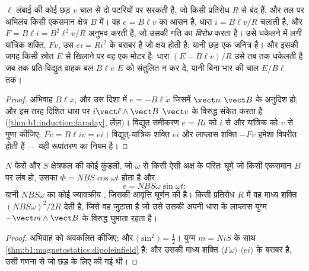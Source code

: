 \begin{proposition}[सरकती छड़]\label{prop:b1:induction:rails}
$\ell$ लंबाई की कोई छड़ $v$ चाल से दो पटरियों पर सरकती है, जो किसी
प्रतिरोध $R$ से बंद हैं, और तल पर अभिलंब किसी एकसमान क्षेत्र $B$ में। वह
 $e = B\ell v$ का आसन है, धारा $i = B\ell v/R$ चलाती है, और
 $F = B\ell i = B^2\ell^2v/R$ अनुभव करती है, जो उसकी गति का
\emph{विरोध} करता है। उसे धकेलने में लगी यांत्रिक शक्ति, $Fv$, उस  $ei = Ri^2$ के बराबर है जो क्षय होती है: यानी छड़ एक जनित्र है। और
इसकी जगह किसी स्रोत $E$ से खिलाने पर वह एक मोटर है: धारा $(E - B\ell v)/R$
उसे तब तक धकेलती है जब तक प्रति-विद्युत वाहक बल $B\ell v$ $E$ को संतुलित न
कर दे, यानी बिना भार की चाल $E/B\ell$ तक।
\end{proposition}

\begin{proof}
अभिवाह $B\ell x$, और उस दिशा में $e = -B\ell\dot x$ जिसमें $\vect n$
$\vect B$ के अनुदिश हो; और इस तरह दिशित धारा पर  $i\vect\ell\wedge\vect B$
$\vect v$ के विरुद्ध संकेत करता है (\cref{thm:b1:induction:faraday},
लेंज़)। विद्युत समीकरण $e = Ri$ को $i$ से और यांत्रिक को $v$ से गुणा
कीजिए: $Fv = B\ell iv = ei$। विद्युत्-यांत्रिक शक्ति
$ei$ और लाप्लास शक्ति $-Fv$ हमेशा विपरीत होती हैं --- यही रूपांतरण का
नियम है।
\end{proof}

\begin{proposition}[घूमता पाश: प्रत्यावर्तित्र]\label{prop:b1:induction:alternator}
$N$ फेरों और $S$ क्षेत्रफल की कोई कुंडली, जो $\omega$ से किसी ऐसी अक्ष के
परितः घूमे जो किसी एकसमान $B$ पर लंब हो, उसका $\Phi = NBS\cos\omega t$ होता है और
\[
e = NBS\omega\sin\omega t :
\]
यानी $NBS\omega$  का कोई ज्यावक्रीय , जिसकी आवृत्ति घूर्णन
की है। किसी प्रतिरोध $R$ में वह माध्य शक्ति $(NBS\omega)^2/2R$ देती है, जिसे
वह  जुटाता है जो उसे उसकी अपनी धारा के लाप्लास युग्म
$-\vect m\wedge\vect B$ के विरुद्ध घुमाता रहता है।
\end{proposition}

\begin{proof}
अभिवाह को अवकलित कीजिए; और $\langle\sin^2\rangle = \tfrac12$। युग्म
$m = Ni S$ के साथ \cref{thm:b1:magnetostatics:dipoleinfield} है; और उसकी माध्य
शक्ति $\langle\Gamma\omega\rangle$ $\langle ei\rangle$ के बराबर है, उसी
गणना से जो छड़ के लिए की गई थी।
\end{proof}

